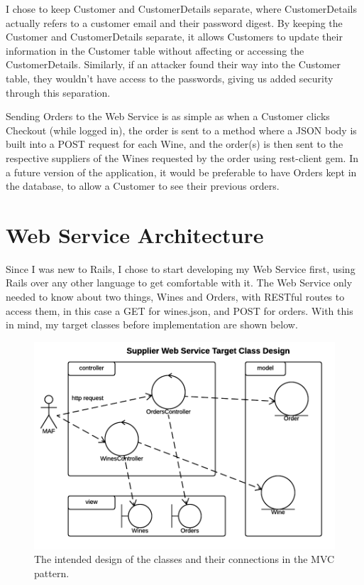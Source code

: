 \documentclass[12pt]{article}
\begin{document}
I chose to keep Customer and CustomerDetails separate, where CustomerDetails actually refers to a customer email and their password digest. By keeping the Customer and CustomerDetails separate, it allows Customers to update their information in the Customer table without affecting or accessing the CustomerDetails. Similarly, if an attacker found their way into the Customer table, they wouldn't have access to the passwords, giving us added security through this separation.

Sending Orders to the Web Service is as simple as when a Customer clicks Checkout (while logged in), the order is sent to a method where a JSON body is built into a POST request for each Wine, and the order(s) is then sent to the respective suppliers of the Wines requested by the order using rest-client\cite{restclient} gem. In a future version of the application, it would be preferable to have Orders kept in the database, to allow a Customer to see their previous orders.


\section{Web Service Architecture}

Since I was new to Rails, I chose to start developing my Web Service first, using Rails over any other language to get comfortable with it. The Web Service only needed to know about two things, Wines and Orders, with RESTful routes to access them, in this case a GET for wines.json, and POST for orders. With this in mind, my target classes before implementation are shown below.

\begin{figure}[H]
        \centering
                \includegraphics[width=1\textwidth]{assets/Supplier_Web_Service_Target_Class_Design}
                \caption{The intended design of the classes and their connections in the MVC pattern.}
                \label{fig: Target Class Diagram.} 
\end{figure}
\end{document}
